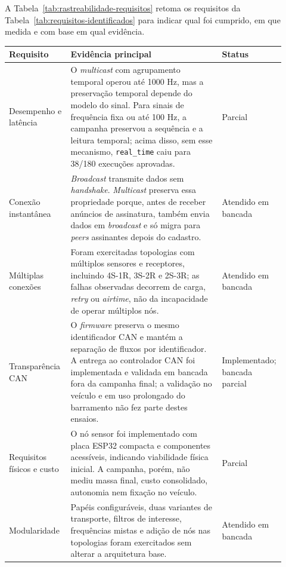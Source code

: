 A Tabela~\ref{tab:rastreabilidade-requisitos} retoma os requisitos da
Tabela~\ref{tab:requisitos-identificados} para indicar qual foi
cumprido, em que medida e com base em qual evidência.

\begin{center}
\scriptsize
\setlength{\tabcolsep}{3pt}
\renewcommand{\arraystretch}{1.12}
\begin{tabular}{p{0.22\linewidth}|p{0.54\linewidth}|p{0.16\linewidth}}
\hline
Requisito & Evidência principal & Status \\
\hline
Desempenho e latência & O \emph{multicast} com agrupamento temporal operou até 1000 Hz, mas a preservação temporal depende do modelo do sinal. Para sinais de frequência fixa ou até 100 Hz, a campanha preservou a sequência e a leitura temporal; acima disso, sem esse mecanismo, \texttt{real\_time} caiu para 38/180 execuções aprovadas. & Parcial \\
\hline
Conexão instantânea & \emph{Broadcast} transmite dados sem \emph{handshake}. \emph{Multicast} preserva essa propriedade porque, antes de receber anúncios de assinatura, também envia dados em \emph{broadcast} e só migra para \emph{peers} assinantes depois do cadastro. & Atendido em bancada \\
\hline
Múltiplas conexões & Foram exercitadas topologias com múltiplos sensores e receptores, incluindo 4S-1R, 3S-2R e 2S-3R; as falhas observadas decorrem de carga, \emph{retry} ou \emph{airtime}, não da incapacidade de operar múltiplos nós. & Atendido em bancada \\
\hline
Transparência CAN & O \emph{firmware} preserva o mesmo identificador CAN e mantém a separação de fluxos por identificador. A entrega ao controlador CAN foi implementada e validada em bancada fora da campanha final; a validação no veículo e em uso prolongado do barramento não fez parte destes ensaios. & Implementado; bancada parcial \\
\hline
Requisitos físicos e custo & O nó sensor foi implementado com placa ESP32 compacta e componentes acessíveis, indicando viabilidade física inicial. A campanha, porém, não mediu massa final, custo consolidado, autonomia nem fixação no veículo. & Parcial \\
\hline
Modularidade & Papéis configuráveis, duas variantes de transporte, filtros de interesse, frequências mistas e adição de nós nas topologias foram exercitados sem alterar a arquitetura base. & Atendido em bancada \\
\hline
\end{tabular}
\label{tab:rastreabilidade-requisitos}
\end{center}

